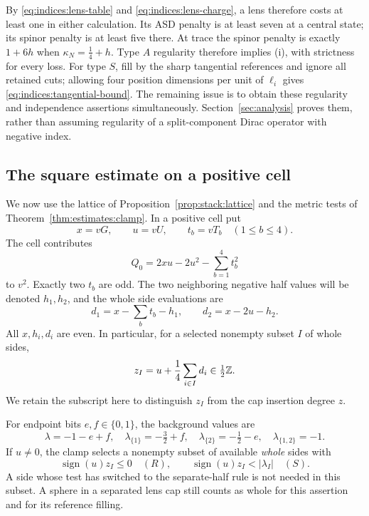 By \eqref{eq:indices:lens-table} and \eqref{eq:indices:lens-charge}, a
lens therefore costs at least one in either calculation.  Its ASD penalty
is at least seven at a central state; its spinor penalty is at least five
there.  At trace the spinor penalty is exactly $1+6h$ when
$\kappa_N=\frac14+h$.  Type $A$ regularity therefore implies (i), with
strictness for every loss.  For type $S$, fill by the sharp tangential
references and ignore all retained cuts; allowing four position
dimensions per unit of $\ell_i$ gives
\eqref{eq:indices:tangential-bound}.  The remaining issue is to obtain
these regularity and independence assertions simultaneously.
Section~\ref{sec:analysis} proves them, rather than assuming regularity of
a split-component Dirac operator with negative index.

\subsection{The square estimate on a positive cell}

We now use the lattice of Proposition~\ref{prop:stack:lattice} and the
metric tests of Theorem~\ref{thm:estimates:clamp}.  In a positive cell put
\[
 x=vG,\qquad u=vU,\qquad t_b=vT_b\quad(1\le b\le4).
\]
The cell contributes
\begin{equation}\label{eq:indices:positive-square}
 Q_0=2xu-2u^2-\sum_{b=1}^4t_b^2
\end{equation}
to $v^2$.  Exactly two $t_b$ are odd.  The two neighboring negative half
values will be denoted $h_1,h_2$, and the whole side evaluations are
\begin{equation}\label{eq:indices:d-values}
 d_1=x-\sum_bt_b-h_1,\qquad d_2=x-2u-h_2.
\end{equation}
All $x,h_i,d_i$ are even.  In particular, for a selected nonempty subset
$I$ of whole sides,
\begin{equation}\label{eq:indices:z-local}
 z_I=u+\frac14\sum_{i\in I}d_i\in\tfrac12\mathbb Z.
\end{equation}
We retain the subscript here to distinguish $z_I$ from the cap insertion
degree $z$.

For endpoint bits $e,f\in\{0,1\}$, the background values are
\begin{equation}\label{eq:indices:lambda-values}
 \lambda=-1-e+f,\quad
 \lambda_{\{1\}}=-\tfrac32+f,\quad
 \lambda_{\{2\}}=-\tfrac12-e,\quad
 \lambda_{\{1,2\}}=-1.
\end{equation}
If $u\ne0$, the clamp selects a nonempty subset of available \emph{whole}
sides with
\begin{equation}\label{eq:indices:clamp-input}
 \operatorname{sign}(u)z_I\le0\quad(R),\qquad
 \operatorname{sign}(u)z_I<|\lambda_I|\quad(S).
\end{equation}
A side whose test has switched to the separate-half rule is not needed
in this subset.  A sphere in a separated lens cap still counts as whole
for this assertion and for its reference filling.

